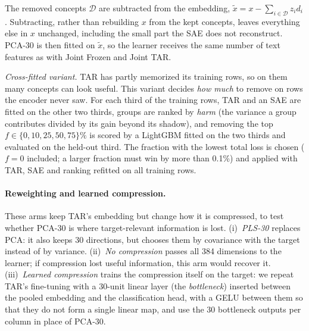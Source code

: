 \documentclass{article}
\begin{document}
The removed concepts $\mathcal{D}$ are subtracted from the embedding, $\tilde x = x-\sum_{i\in\mathcal{D}} z_i d_i$.
Subtracting, rather than rebuilding $x$ from the kept concepts, leaves everything else in $x$ unchanged, including
the small part the SAE does not reconstruct. PCA-30 is then fitted on $\tilde x$, so the learner receives the same
number of text features as with Joint Frozen and Joint TAR.




\emph{Cross-fitted variant.} TAR has partly memorized its training rows, so on them many concepts can look
useful. This variant decides \emph{how much} to remove on rows the encoder never saw. For each third of the training
rows, TAR and an SAE are fitted on the other two thirds, groups are ranked by \emph{harm} (the variance a group
contributes divided by its gain beyond its shadow), and removing the top $f\in\{0,10,25,50,75\}\%$ is scored by a
LightGBM fitted on the two thirds and evaluated on the held-out third. The fraction with the lowest total loss is
chosen ($f=0$ included; a larger fraction must win by more than 0.1\%) and applied with TAR, SAE and ranking refitted
on all training rows.



\paragraph{Reweighting and learned compression.} These arms keep TAR's embedding but change how it is compressed,
to test whether PCA-30 is where target-relevant information is lost. (i)~\emph{PLS-30} \citep{wold2001pls}
replaces PCA: it also keeps 30 directions, but chooses them by covariance with the target instead of by variance.
(ii)~\emph{No compression} passes all 384 dimensions to the learner; if compression lost useful information, this
arm would recover it. (iii)~\emph{Learned compression} trains the compression itself on the target: we repeat TAR's
fine-tuning with a 30-unit linear layer (the \emph{bottleneck}) inserted between the pooled embedding and the
classification head, with a GELU between them so that they do not form a single linear map, and use the 30
bottleneck outputs per column in place of PCA-30.
\end{document}
